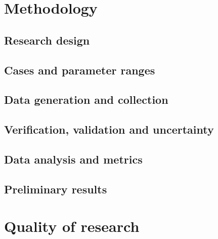 \documentclass[11pt,a4paper]{article}
\begin{document}
\section{Methodology}
\subsection{Research design}
\subsection{Cases and parameter ranges}
\subsection{Data generation and collection}
\subsection{Verification, validation and uncertainty}
\subsection{Data analysis and metrics}
\subsection{Preliminary results}

\section{Quality of research}
\end{document}
